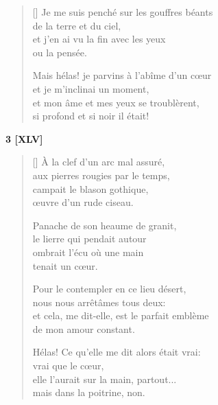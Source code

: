 \documentclass[a4paper,12pt]{book}
\begin{document}
\settowidth{\versewidth}{Mais hélas! je parvins à l'abîme d'un cœur}

\begin{verse}[\versewidth]
  Je me suis penché sur les gouffres béants \\
  de la terre et du ciel, \\
  et j'en ai vu la fin avec les yeux \\
  ou la pensée.

  Mais hélas! je parvins à l'abîme d'un cœur \\
  et je m'inclinai un moment, \\
  et mon âme et mes yeux se troublèrent, \\
  si profond et si noir il était!
\end{verse}

\bigskip

\begin{center}
  \textbf{3 [XLV]}
\end{center}

\settowidth{\versewidth}{et cela, me dit-elle, est le parfait emblème}

\begin{verse}[\versewidth]
  À la clef d'un arc mal assuré, \\
  aux pierres rougies par le temps, \\
  campait le blason gothique, \\
  œuvre d'un rude ciseau.

  Panache de son heaume de granit, \\
  le lierre qui pendait autour \\
  ombrait l'écu où une main \\
  tenait un cœur.

  Pour le contempler en ce lieu désert, \\
  nous nous arrêtâmes tous deux: \\
  et cela, me dit-elle, est le parfait emblème \\
  de mon amour constant.

  Hélas! Ce qu'elle me dit alors était vrai: \\
  vrai que le cœur, \\
  elle l'aurait sur la main, partout... \\
  mais dans la poitrine, non.
\end{verse}

\bigskip
\end{document}
